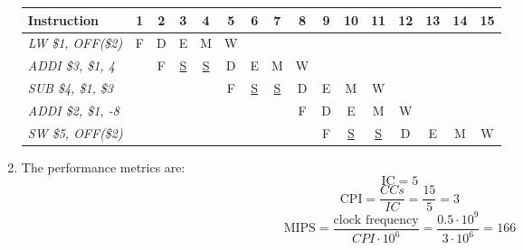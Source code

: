 \begin{enumerate}
\begin{table}[H]
\begin{tabular}{l|ccccccccccccccc}
            \textbf{Instruction}     & \textbf{1} & \textbf{2} & \textbf{3} & \textbf{4} & \textbf{5} & \textbf{6} & \textbf{7} & \textbf{8} & \textbf{9} & \textbf{10} & \textbf{11} & \textbf{12} & \textbf{13} & \textbf{14} & \textbf{15} \\ \hline
            \textit{LW \$1, OFF(\$2)}  & F          & D          & E          & M          & W          &            &            &            &            &             &             &             &             &             &             \\
            \textit{ADDI \$3, \$1, 4}  &            & F          & \underline{S}    & \underline{S}     & D          & E          & M          & W          &            &             &             &             &             &             &             \\
            \textit{SUB \$4, \$1, \$3} &            &            &            &            & F          & \underline{S}     & \underline{S}     & D          & E          & M           & W           &             &             &             &             \\
            \textit{ADDI \$2, \$1, -8} &            &            &            &            &            &            &            & F          & D          & E           & M           & W           &             &             &             \\
            \textit{SW \$5, OFF(\$2)}  &            &            &            &            &            &            &            &            & F          & \underline{S}      & \underline{S}      & D           & E           & M           & W          
            \end{tabular}
        \end{table}
    \item The performance metrics are: 
        \[\text{IC}=5\]
        \[\text{CPI}=\dfrac{CCs}{IC}=\dfrac{15}{5}=3\]
        \[\text{MIPS}=\dfrac{\text{clock frequency}}{CPI \cdot 10^6}=\dfrac{0.5\cdot 10^9}{3 \cdot 10^6}=166\]
\end{enumerate}
